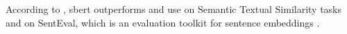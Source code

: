 According to \citeauthor{HfsentTrans2019}, \ac{sbert} outperforms \infersent{} and \ac{use} on Semantic Textual Similarity tasks 
and on SentEval, which is an evaluation toolkit for sentence embeddings \cite{HfsentTrans2019}.
